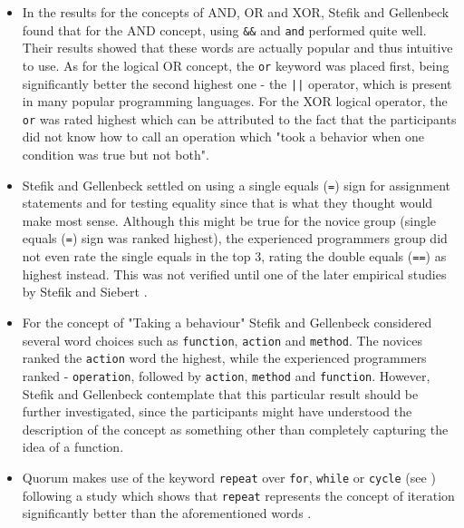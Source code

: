 \documentclass[preprint,10pt]{sigplanconf}
\begin{document}
\begin{itemize}
\item In the results for the concepts of AND, OR and XOR, Stefik and Gellenbeck \cite{EmpStudiesonStimuli} found that for the AND concept, using \lstinline!&&! and \lstinline!and! performed quite well. Their results showed that these words are actually popular and thus intuitive to use. As for the logical OR concept, the \lstinline!or! keyword was placed first, being significantly better the second highest one - the \lstinline!||! operator, which is present in many popular programming languages. For the XOR logical operator, the \lstinline!or! was rated highest which can be attributed to the fact that the participants did not know how to call an operation which "took a behavior when one condition was true but not both".
\item Stefik and Gellenbeck \cite{EmpStudiesonStimuli} settled on using a single equals (\lstinline!=!) sign for assignment statements and for testing equality since that is what they thought would make most sense. Although this might be true for the novice group (single equals (\lstinline!=!) sign was ranked highest), the experienced programmers group did not even rate the single equals in the top 3, rating the double equals (\lstinline!==!) as highest instead. This was not verified until one of the later empirical studies by Stefik and Siebert \cite{Empiricalinvestigation}.
\item For the concept of "Taking a behaviour" Stefik and Gellenbeck considered several word choices such as \lstinline!function!, \lstinline!action! and \lstinline!method!. The novices ranked the \lstinline!action! word the highest, while the experienced programmers ranked - \lstinline!operation!, followed by \lstinline!action!, \lstinline!method! and \lstinline!function!. However, Stefik and Gellenbeck contemplate that this particular result should be further investigated, since the participants might have understood the description of the concept as something other than completely capturing the idea of a function.
\item Quorum makes use of the keyword \lstinline!repeat! over \lstinline!for!, \lstinline!while! or \lstinline!cycle! (see %
\cite{SanchezData}) following a study which shows that \lstinline!repeat! represents the concept of iteration significantly better than the aforementioned words \cite{EmpStudiesonStimuli}.
\end{itemize}
\end{document}
